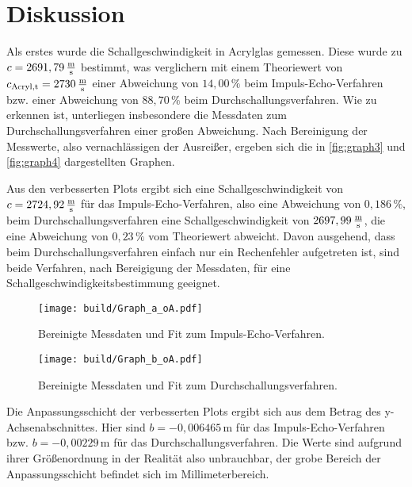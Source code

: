 \section{Diskussion}
\label{sec:Diskussion}
Als erstes wurde die Schallgeschwindigkeit in Acrylglas gemessen.%
Diese wurde zu $c = 2691,79 \,\unit{\frac{\meter}{\second}}$ bestimmt, was verglichern mit einem Theoriewert von
$c_{\text{Acryl},\text{t}} = 2730 \,\unit{\frac{\meter}{\second}} $ einer Abweichung von $14,00 \, \%$ beim Impuls-Echo-Verfahren 
bzw. einer Abweichung von $88,70 \, \%$ beim Durchschallungsverfahren. 
Wie zu erkennen ist, unterliegen insbesondere die Messdaten zum Durchschallungsverfahren einer großen Abweichung.
Nach Bereinigung der Messwerte, also vernachlässigen der Ausreißer, ergeben sich die in \autoref{fig:graph3} und \autoref{fig:graph4} %
dargestellten Graphen.

Aus den verbesserten Plots ergibt sich eine Schallgeschwindigkeit von $c = 2724,92 \,\unit{\frac{\meter}{\second}}$ für das
Impuls-Echo-Verfahren, also eine Abweichung von $0,186 \,\%$, beim Durchschallungsverfahren eine Schallgeschwindigkeit von
$2697,99 \,\unit{\frac{\meter}{\second}}$, die eine Abweichung von $0,23 \, \% $ vom Theoriewert abweicht. %
Davon ausgehend, dass beim Durchschallungsverfahren einfach nur ein Rechenfehler aufgetreten ist, sind beide Verfahren, nach
Bereigigung der Messdaten, für eine Schallgeschwindigkeitsbestimmung geeignet. \\

\begin{figure}[H]
    \centering
    \texttt{[image: build/Graph\_a\_oA.pdf]}
    \caption{Bereinigte Messdaten und Fit zum Impuls-Echo-Verfahren.}
    \label{fig:graph3}
\end{figure}

\begin{figure}[H]
    \centering
    \texttt{[image: build/Graph\_b\_oA.pdf]}
    \caption{Bereinigte Messdaten und Fit zum Durchschallungsverfahren.}
    \label{fig:graph4}
\end{figure}

Die Anpassungsschicht der verbesserten Plots ergibt sich aus dem Betrag des y-Achsenabschnittes.
Hier sind $b = -0,006465 \,\unit{\meter}$ für das Impuls-Echo-Verfahren bzw. $b = -0,00229 \,\unit{\meter}$ für das
Durchschallungsverfahren. 
Die Werte sind aufgrund ihrer Größenordnung in der Realität also unbrauchbar, der grobe Bereich der Anpassungsschicht befindet sich im Millimeterbereich.\\ 

